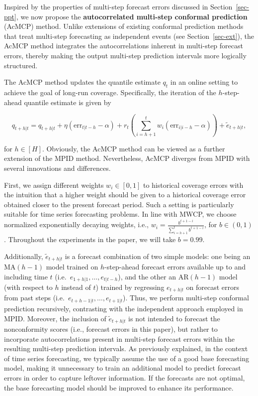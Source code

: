 \documentclass[
  11pt,
  a4paper,
]{article}
\theoremstyle{plain}
\theoremstyle{plain}
\theoremstyle{remark}
\begin{document}
Inspired by the properties of multi-step forecast errors discussed in
Section~\ref{sec-ppt}, we now propose the \textbf{autocorrelated
multi-step conformal prediction} (AcMCP) method. Unlike extensions of
existing conformal prediction methods that treat multi-step forecasting
as independent events (see Section~\ref{sec-ext}), the AcMCP method
integrates the autocorrelations inherent in multi-step forecast errors,
thereby making the output multi-step prediction intervals more logically
structured.

The AcMCP method updates the quantile estimate \(q_t\) in an online
setting to achieve the goal of long-run coverage. Specifically, the
iteration of the \(h\)-step-ahead quantile estimate is given by

\[
q_{t+h|t}=q_{t+h|t}+\eta \left(\mathrm{err}_{t|t-h}-\alpha\right)+r_t\left(\sum_{i=h+1}^t w_{i}\left(\mathrm{err}_{i|i-h}-\alpha\right)\right)+\tilde{e}_{t+h|t},
\]

for \(h\in[H]\). Obviously, the AcMCP method can be viewed as a further
extension of the MPID method. Nevertheless, AcMCP diverges from MPID
with several innovations and differences.

First, we assign different weights \(w_i \in [0,1]\) to historical
coverage errors with the intuition that a higher weight should be given
to a historical coverage error obtained closer to the present forecast
period. Such a setting is particularly suitable for time series
forecasting problems. In line with MWCP, we choose normalized
exponentially decaying weights, i.e.,
\(w_i = \frac{b^{t+1-i}}{\sum_{i=h+1}^{t}b^{t+1-i}}\), for
\(b \in (0, 1)\). Throughout the experiments in the paper, we will take
\(b = 0.99\).

Additionally, \(\tilde{e}_{t+h|t}\) is a forecast combination of two
simple models: one being an MA\((h-1)\) model trained on
\(h\)-step-ahead forecast errors available up to and including time
\(t\) (i.e.~\(e_{1+h|1}, \ldots, e_{t|t-h}\)), and the other an
AR\((h-1)\) model (with respect to \(h\) instead of \(t\)) trained by
regressing \(e_{t+h|t}\) on forecast errors from past steps
(i.e.~\(e_{t+h-1|t}, \ldots, e_{t+1|t}\)). Thus, we perform multi-step
conformal prediction recursively, contrasting with the independent
approach employed in MPID. Moreover, the inclusion of
\(\tilde{e}_{t+h|t}\) is not intended to forecast the nonconformity
scores (i.e., forecast errors in this paper), but rather to incorporate
autocorrelations present in multi-step forecast errors within the
resulting multi-step prediction intervals. As previously explained, in
the context of time series forecasting, we typically assume the use of a
good base forecasting model, making it unnecessary to train an
additional model to predict forecast errors in order to capture leftover
information. If the forecasts are not optimal, the base forecasting
model should be improved to enhance its performance.
\end{document}
